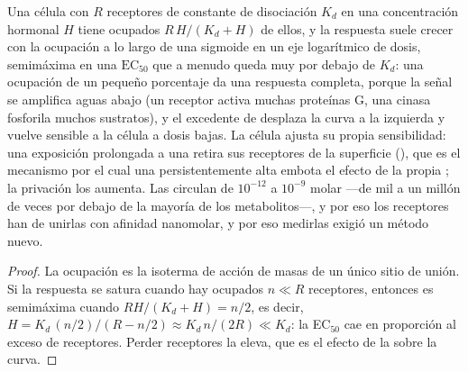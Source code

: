 \begin{proposition}\label{prop:b3:endocrinology:dose}
Una célula con $R$ receptores de constante de disociación $K_{d}$ en
una concentración hormonal $H$ tiene ocupados $R\,H/(K_{d} + H)$ de
ellos, y la respuesta suele crecer con la ocupación a lo largo de una
sigmoide en un eje logarítmico de dosis, semimáxima en una
$\text{EC}_{50}$ que a menudo queda muy por debajo de $K_{d}$: una
ocupación de un pequeño porcentaje da una respuesta completa, porque la
señal se amplifica aguas abajo (un receptor activa muchas proteínas G,
una cinasa fosforila muchos sustratos), y el excedente de
\emph{} desplaza la curva a la izquierda y vuelve
sensible a la célula a dosis bajas. La célula ajusta su propia
sensibilidad: una exposición prolongada a una  retira sus
receptores de la superficie (\emph{}), que es el
mecanismo por el cual una  persistentemente alta embota el
efecto de la propia ; la privación los aumenta. Las 
circulan de $10^{-12}$ a $10^{-9}$ molar ---de mil a un millón de veces
por debajo de la mayoría de los metabolitos---, y por eso los
receptores han de unirlas con afinidad nanomolar, y por eso medirlas
exigió un método nuevo.
\end{proposition}
\begin{proof}
La ocupación es la isoterma de acción de masas de un único sitio de
unión. Si la respuesta se satura cuando hay ocupados $n \ll R$
receptores, entonces es semimáxima cuando $R H/(K_{d} + H) = n/2$, es
decir, $H = K_{d}\,
(n/2)/(R - n/2) \approx K_{d}\, n/(2R) \ll K_{d}$: la EC$_{50}$ cae en
proporción al exceso de receptores. Perder receptores la eleva, que es
el efecto de la  sobre la curva.
\end{proof}

